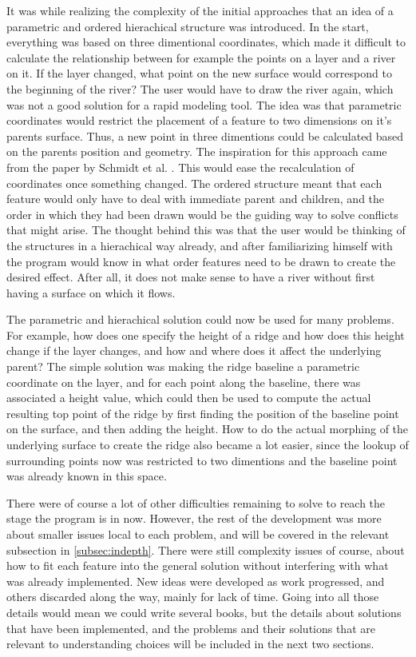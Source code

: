 \documentclass[a4paper,12pt]{report}
\begin{document}
It was while realizing the complexity of the initial approaches that an idea of a parametric and ordered hierachical structure was introduced. In the start, everything was based on three dimentional coordinates, which made it difficult to calculate the relationship between for example the points on a layer and a river on it. If the layer changed, what point on the new surface would correspond to the beginning of the river? The user would have to draw the river again, which was not a good solution for a rapid modeling tool. The idea was that parametric coordinates would restrict the placement of a feature to two dimensions on it's parents surface. Thus, a new point in three dimentions could be calculated based on the parents position and geometry. The inspiration for this approach came from the paper by Schmidt et al. \cite{CGF:CGF1129}. This would ease the recalculation of coordinates once something changed. The ordered structure meant that each feature would only have to deal with immediate parent and 
children, and the order in which they had been drawn would be the guiding way to solve conflicts that might arise. The thought behind this was that the user would be thinking of the structures in a hierachical way already, and after familiarizing himself with the program would know in what order features need to be drawn to create the desired effect. After all, it does not make sense to have a river without first having a surface on which it flows.

The parametric and hierachical solution could now be used for many problems. For example, how does one specify the height of a ridge and how does this height change if the layer changes, and how and where does it affect the underlying parent? The simple solution was making the ridge baseline a parametric coordinate on the layer, and for each point along the baseline, there was associated a height value, which could then be used to compute the actual resulting top point of the ridge by first finding the position of the baseline point on the surface, and then adding the height. How to do the actual morphing of the underlying surface to create the ridge also became a lot easier, since the lookup of surrounding points now was restricted to two dimentions and the baseline point was already known in this space.

There were of course a lot of other difficulties remaining to solve to reach the stage the program is in now. However, the rest of the development was more about smaller issues local to each problem, and will be covered in the relevant subsection in \ref{subsec:indepth}.  There were still complexity issues of course, about how to fit each feature into the general solution without interfering with what was already implemented. New ideas were developed as work progressed, and others discarded along the way, mainly for lack of time. Going into all those details would mean we could write several books, but the details about solutions that have been implemented, and the problems and their solutions that are relevant to understanding choices will be included in the next two sections.
\end{document}
